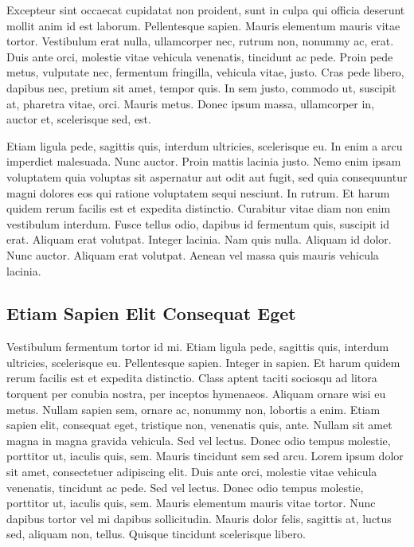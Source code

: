 \documentclass[english,master,dept460,male,cpp,cpdeclaration]{diploma}
\begin{document}
Excepteur sint occaecat cupidatat non proident, sunt in culpa qui officia deserunt mollit anim id est laborum. Pellentesque sapien. Mauris elementum mauris vitae tortor. Vestibulum erat nulla, ullamcorper nec, rutrum non, nonummy ac, erat. Duis ante orci, molestie vitae vehicula venenatis, tincidunt ac pede. Proin pede metus, vulputate nec, fermentum fringilla, vehicula vitae, justo. Cras pede libero, dapibus nec, pretium sit amet, tempor quis. In sem justo, commodo ut, suscipit at, pharetra vitae, orci. Mauris metus. Donec ipsum massa, ullamcorper in, auctor et, scelerisque sed, est.

Etiam ligula pede, sagittis quis, interdum ultricies, scelerisque eu. In enim a arcu imperdiet malesuada. Nunc auctor. Proin mattis lacinia justo. Nemo enim ipsam voluptatem quia voluptas sit aspernatur aut odit aut fugit, sed quia consequuntur magni dolores eos qui ratione voluptatem sequi nesciunt. In rutrum. Et harum quidem rerum facilis est et expedita distinctio. Curabitur vitae diam non enim vestibulum interdum. Fusce tellus odio, dapibus id fermentum quis, suscipit id erat. Aliquam erat volutpat. Integer lacinia. Nam quis nulla. Aliquam id dolor. Nunc auctor. Aliquam erat volutpat. Aenean vel massa quis mauris vehicula lacinia.

\subsection{Etiam Sapien Elit Consequat Eget}
Vestibulum fermentum tortor id mi. Etiam ligula pede, sagittis quis, interdum ultricies, scelerisque eu. Pellentesque sapien. Integer in sapien. Et harum quidem rerum facilis est et expedita distinctio. Class aptent taciti sociosqu ad litora torquent per conubia nostra, per inceptos hymenaeos. Aliquam ornare wisi eu metus. Nullam sapien sem, ornare ac, nonummy non, lobortis a enim. Etiam sapien elit, consequat eget, tristique non, venenatis quis, ante. Nullam sit amet magna in magna gravida vehicula. Sed vel lectus. Donec odio tempus molestie, porttitor ut, iaculis quis, sem. Mauris tincidunt sem sed arcu. Lorem ipsum dolor sit amet, consectetuer adipiscing elit. Duis ante orci, molestie vitae vehicula venenatis, tincidunt ac pede. Sed vel lectus. Donec odio tempus molestie, porttitor ut, iaculis quis, sem. Mauris elementum mauris vitae tortor. Nunc dapibus tortor vel mi dapibus sollicitudin. Mauris dolor felis, sagittis at, luctus sed, aliquam non, tellus. Quisque tincidunt scelerisque libero.
\end{document}
